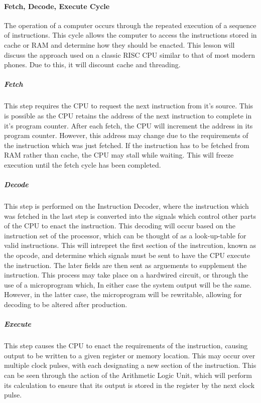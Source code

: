 \documentclass[a4paper,11pt,draft]{article}
\begin{document}
			\paragraph{Fetch, Decode, Execute Cycle}
				The operation of a computer occurs through the repeated execution of a sequence of instructions.
				This cycle allows the computer to access the instructions stored in cache or RAM and determine how they should be enacted. This lesson will discuss the approach used on a classic RISC CPU similar to that of most modern phones. 
				Due to this, it will discount cache and threading. 
				\subparagraph{Fetch}
					This step requires the CPU to request the next instruction from it's source. 
					This is possible as the CPU retains the address of the next instruction to complete in it's program counter. 
					After each fetch, the CPU will increment the address in its program counter. 
					However, this address may change due to the requirements of the instruction which was just fetched. 
					If the instruction has to be fetched from RAM rather than cache, the CPU may stall while waiting.
					This will freeze execution until the fetch cycle has been completed. 
				\subparagraph{Decode}
					This step is performed on the Instruction Decoder, where the instruction which was fetched in the last step is converted into the signals which control other parts of the CPU to enact the instruction. 
					This decoding will occur based on the instruction set of the processor, which can be thought of as a look-up-table for valid instructions. 
					This will intrepret the first section of the instrcution, known as the opcode, and determine which signals must be sent to have the CPU execute the instruction. 
					The later fields are then sent as arguements to supplement the instruction. 
					This process may take place on a hardwired circuit, or through the use of a microprogram which, In either case the system output will be the same. 
					However, in the latter case, the microprogram will be rewritable, allowing for decoding to be altered after production. 
				\subparagraph{Execute}
					This step causes the CPU to enact the requirements of the instruction, causing output to be written to a given register or memory location. 
					This may occur over multiple clock pulses, with each designating a new section of the instruction. 
					This can be seen through the action of the Arithmetic Logic Unit, which will perform its calculation to ensure that its output is stored in the register by the next clock pulse. 
\end{document}
